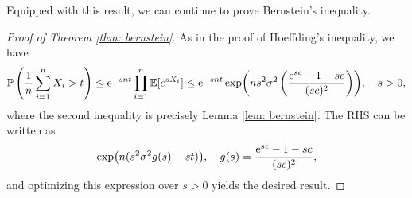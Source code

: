 Equipped with this result, we can continue to prove Bernstein's inequality.

\begin{proof}[Proof of Theorem \ref{thm: bernstein}]
As in the proof of Hoeffding's inequality, we have
\[
    \mathbb{P}\left(\frac{1}{n} \sum_{i=1}^n X_i > t\right) \leq \mathrm{e}^{-snt} \prod_{i=1}^n \mathbb{E}[e^{sX_i}] \leq \mathrm{e}^{-snt} \exp( n s^2 \sigma^2 \left( \frac{\mathrm{e}^{sc} - 1 - sc}{(sc)^2} \right) ), \quad s > 0,
\]
where the second inequality is precisely Lemma \ref{lem: bernstein}. The RHS can be written as
\[
    \exp( n (s^2 \sigma^2 g(s) - st) ), \quad g(s) = \frac{\mathrm{e}^{sc} - 1 - sc}{(sc)^2},
\]
and optimizing this expression over $s > 0$ yields the desired result.
\end{proof}
